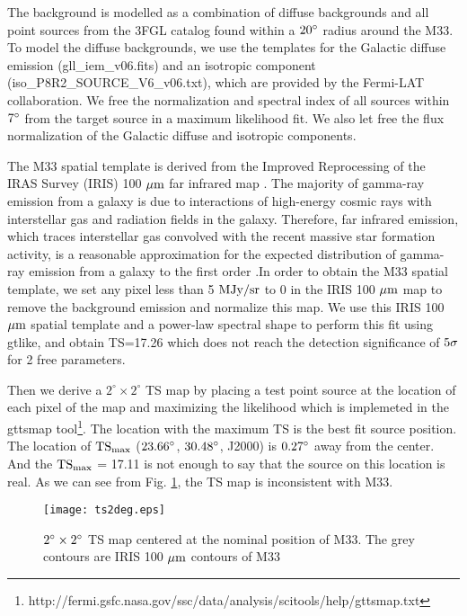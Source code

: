 \documentclass[useAMS,usenatbib,referee]{mn2e}
\begin{document}
The background is modelled as a combination of diffuse backgrounds and all point sources from the 3FGL catalog found within a $20^{\rm \circ}$  radius around the M33. To model the diffuse backgrounds, we use the templates for the Galactic diffuse emission (gll\_iem\_v06.fits) and an isotropic component (iso\_P8R2\_SOURCE\_V6\_v06.txt), which are provided by the Fermi-LAT collaboration. We free the normalization and spectral index of all sources within $7^{\rm \circ}$  from the target source in a maximum likelihood fit. We also let free the flux normalization of the Galactic diffuse and isotropic components.

The M33 spatial template is derived from the Improved Reprocessing of the IRAS Survey (IRIS) 100 ${\rm \mu m} $ far infrared map \citet{mdl2005}. The majority of gamma-ray emission from a galaxy is due to interactions of high-energy cosmic rays with interstellar gas and radiation fields in the galaxy. Therefore, far infrared emission, which traces interstellar gas convolved with the recent massive star formation activity, is a reasonable approximation for the expected distribution of gamma-ray emission from a galaxy to the first order \citep{aaa+2010c}.In order to obtain the M33 spatial template, we set any pixel less than 5 ${\rm MJy/sr}$ to 0 in the IRIS 100 ${\rm \mu m} $ map to remove the background emission and normalize this map. We use this IRIS 100 ${\rm \mu m} $ spatial template and a power-law spectral shape to perform this fit using gtlike, and obtain TS=17.26 which does not reach the detection significance of $5{\rm \sigma}$ for 2 free parameters.

Then we derive  a $2^{\circ} \times 2^{\circ}$ TS map by placing a test point source at the location of each pixel of the map and maximizing the likelihood which is implemeted in the gttsmap tool\footnote{http://fermi.gsfc.nasa.gov/ssc/data/analysis/scitools/help/gttsmap.txt}. The location with the maximum TS is the best fit source position. The location of ${\rm TS_{max}}$  ($23.66^{\rm \circ}$, $30.48^{\rm \circ}$, J2000) is $0.27^{\rm \circ}$ away from the center. And the ${\rm TS_{max}}$ = 17.11  is not enough to say that the source on this location is real.  As we can see from Fig. \ref{Tsmap}, the TS map is inconsistent with M33.

\begin{figure}%
\texttt{[image: ts2deg.eps]}
\caption{$2^{\rm \circ} \times 2^{\rm \circ}$ TS map centered at the nominal position of M33. The grey contours are IRIS 100 ${\rm \mu m} $ contours of M33}
\label{Tsmap}
\end{figure}
	
\end{document}
